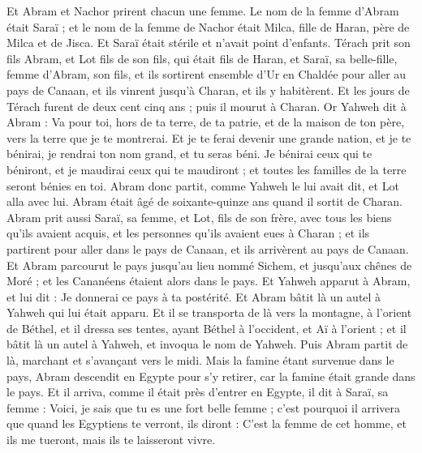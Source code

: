 \begin{multicols}{2}
Et Abram et Nachor prirent chacun une femme. Le nom de la femme d'Abram était Saraï ; et le nom de la femme de Nachor était Milca, fille de Haran, père de Milca et de Jisca.
Et Saraï était stérile et n'avait point d'enfants.
Térach prit son fils Abram, et Lot fils de son fils, qui était fils de Haran, et Saraï, sa belle-fille, femme d'Abram, son fils, et ils sortirent ensemble d'Ur en Chaldée pour aller au pays de Canaan, et ils vinrent jusqu'à Charan, et ils y habitèrent.
Et les jours de Térach furent de deux cent cinq ans ; puis il mourut à Charan.
\VerseOne{}Or Yahweh dit à Abram : Va pour toi, hors de ta terre, de ta patrie, et de la maison de ton père, vers la terre que je te montrerai.
Et je te ferai devenir une grande nation, et je te bénirai, je rendrai ton nom grand, et tu seras béni.
Je bénirai ceux qui te béniront, et je maudirai ceux qui te maudiront ; et toutes les familles de la terre seront bénies en toi.
Abram donc partit, comme Yahweh le lui avait dit, et Lot alla avec lui. Abram était âgé de soixante-quinze ans quand il sortit de Charan.
Abram prit aussi Saraï, sa femme, et Lot, fils de son frère, avec tous les biens qu'ils avaient acquis, et les personnes qu'ils avaient eues à Charan ; et ils partirent pour aller dans le pays de Canaan, et ils arrivèrent au pays de Canaan.
Et Abram parcourut le pays jusqu'au lieu nommé Sichem, et jusqu'aux chênes de Moré ; et les Cananéens étaient alors dans le pays.
Et Yahweh apparut à Abram, et lui dit : Je donnerai ce pays à ta postérité. Et Abram bâtit là un autel à Yahweh qui lui était apparu.
Et il se transporta de là vers la montagne, à l'orient de Béthel, et il dressa ses tentes, ayant Béthel à l'occident, et Aï à l'orient ; et il bâtit là un autel à Yahweh, et invoqua le nom de Yahweh.
Puis Abram partit de là, marchant et s'avançant vers le midi.
Mais la famine étant survenue dans le pays, Abram descendit en Egypte pour s'y retirer, car la famine était grande dans le pays.
Et il arriva, comme il était près d'entrer en Egypte, il dit à Saraï, sa femme : Voici, je sais que tu es une fort belle femme ;
c'est pourquoi il arrivera que quand les Egyptiens te verront, ils diront : C'est la femme de cet homme, et ils me tueront, mais ils te laisseront vivre.

\end{multicols}

